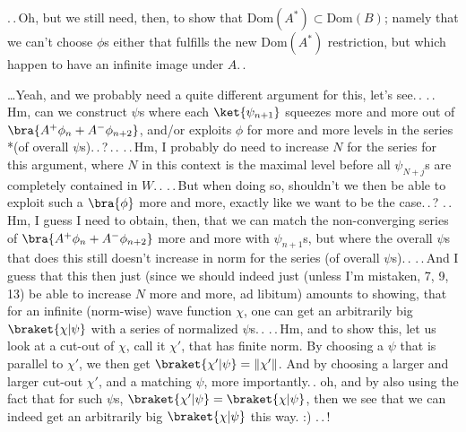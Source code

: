 \documentclass{report}
\begin{document}
.\,.\,Oh, but we still need, then, to show that $\mathrm{Dom}(A^*)\subset\mathrm{Dom}(B)$; namely that we can't choose $\phi$s either that fulfills the new $\mathrm{Dom}(A^*)$ restriction, but which happen to have an infinite image under $A$.\,. %

\ldots Yeah, and we probably need a quite different argument for this, let's see.\,. .\,.\,Hm, can we construct $\psi$s where each $\ket{\psi_{n+1}}$ squeezes more and more out of $\bra{A^+ \phi_{n} + A^- \phi_{n+2}}$, and/or exploits $\phi$ for more and more levels in the series *(of overall $\psi$s).\,.\,?\,.\,. %
.\,.\,Hm, I probably do need to increase $N$ for the series for this argument, where $N$ in this context is the maximal level before all $\psi_{N+j}$s are completely contained in $W$.\,. %
.\,.\,But when doing so, shouldn't we then be able to exploit such a $\bra{\phi}$ more and more, exactly like we want to be the case.\,.\,? .\,.\,Hm, I guess I need to obtain, then, that we can match the non-converging series of $\bra{A^+ \phi_{n} + A^- \phi_{n+2}}$ more and more with $\psi_{n+1}$s, but where the overall $\psi$s that does this still doesn't increase in norm for the series (of overall $\psi$s).\,. .\,.\,And I guess that this then just (since we should indeed just (unless I'm mistaken, 7, 9, 13) be able to increase $N$ more and more, ad libitum) amounts to showing, that for an infinite (norm-wise) wave function $\chi$, one can get an arbitrarily big $\braket{\chi | \psi}$ with a series of normalized $\psi$s.\,. .\,.\,Hm, and to show this, let us look at a cut-out of $\chi$, call it $\chi'$, that has finite norm. By choosing a $\psi$ that is parallel to $\chi'$, we then get $\braket{\chi' | \psi} = \|\chi'\|$. And by choosing a larger and larger cut-out $\chi'$, and a matching $\psi$, more importantly.\,. oh, and by also using the fact that for such $\psi$s, $\braket{\chi' | \psi}=\braket{\chi | \psi}$, then we see that we can indeed get an arbitrarily big $\braket{\chi | \psi}$ this way. :) .\,.\,! %

\end{document}
